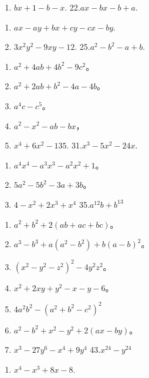 \begin{enumerate}[start=21]
\item
  \(bx + 1 - b - x.\) 22.\(ax - bx - b + a.\)
\end{enumerate}

\begin{enumerate}[start=23]
\item
  \(ax - ay + bx + cy - cx - by.\)
\item
  \(3x^{2}y^{2} - 9xy - 12.\) 25.\(a^2 - b^2 - a + b.\)
\end{enumerate}

\begin{enumerate}[start=26]
\item
  \(a^2 + 4ab + 4b^2 - 9c^2\)。
\item
  \(a^2 + 2ab + b^2 - 4a - 4b\)。
\item
  \(a^4 c - c^5\)。
\item
  \(a^2 - x^2 - ab - bx\)，
\item
  \(x^{4} + 6x^{2} - 135.\) 31.\(x^{3} - 5x^{2} - 24x.\)
\end{enumerate}

\begin{enumerate}[start=32]
\item
  \(a^4 x^4 - a^3 x^3 - a^2 x^2 + 1\)。
\item
  \(5a^2 - 5b^2 - 3a + 3b\)。
\item
  \(4 - x^{2} + 2x^{3} + x^{4}\) 35.\(a^{12}b + b^{13}\)
\end{enumerate}

\begin{enumerate}[start=36]
\item
  \(a^2 + b^2 + 2(ab + ac + bc)\)。
\item
  \(a^3 - b^3 + a(a^2 - b^2) + b(a - b)^2\)。
\item
  \((x^{2} - y^{2} - z^{2})^{2} - 4y^{2}z^{2}\)。
\item
  \(x^{2} + 2xy + y^{2} - x - y - 6\)。
\item
  \(4a^{2}b^{2} - (a^{2} + b^{2} - c^{2})^{2}\)
\item
  \(a^2 - b^2 + x^2 - y^2 + 2(ax - by)\)。
\item
  \(x^{3} - 27y^{6} - x^{4} + 9y^{4}\) 43.\(x^{24} - y^{24}\)
\end{enumerate}

\begin{enumerate}[start=44]
\item
  \(x^{4} - x^{3} + 8x - 8.\)
\end{enumerate}

